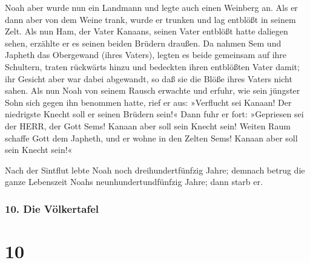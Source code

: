  Noah aber wurde nun ein Landmann und legte auch einen
Weinberg an.  Als er dann aber von dem Weine trank, wurde
er trunken und lag entblößt in seinem Zelt.  Als nun Ham,
der Vater Kanaans, seinen Vater entblößt hatte daliegen sehen, erzählte
er es seinen beiden Brüdern draußen.  Da nahmen Sem und
Japheth das Obergewand (ihres Vaters), legten es beide gemeinsam auf
ihre Schultern, traten rückwärts hinzu und bedeckten ihren entblößten
Vater damit; ihr Gesicht aber war dabei abgewandt, so daß sie die Blöße
ihres Vaters nicht sahen.  Als nun Noah von seinem Rausch
erwachte und erfuhr, wie sein jüngster Sohn sich gegen ihn benommen
hatte,  rief er aus: »Verflucht sei Kanaan! Der
niedrigste Knecht soll er seinen Brüdern sein!«  Dann
fuhr er fort: »Gepriesen sei der HERR, der Gott Sems! Kanaan aber soll
sein Knecht sein!  Weiten Raum schaffe Gott dem Japheth,
und er wohne in den Zelten Sems! Kanaan aber soll sein Knecht sein!«

 Nach der Sintflut lebte Noah noch dreihundertfünfzig
Jahre;  demnach betrug die ganze Lebenszeit Noahs
neunhundertundfünfzig Jahre; dann starb er.

\hypertarget{die-vuxf6lkertafel}{%
\subsubsection{10. Die Völkertafel}\label{die-vuxf6lkertafel}}

\hypertarget{section-9}{%
\section{10}\label{section-9}}

